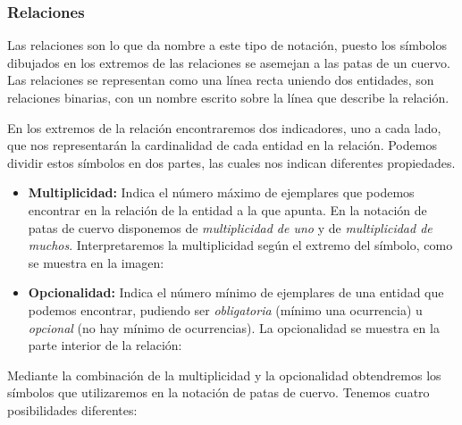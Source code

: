 \subsubsection{Relaciones}
Las relaciones son lo que da nombre a este tipo de notación, puesto los símbolos dibujados en los extremos de las relaciones se asemejan a las patas de un cuervo. Las relaciones se representan como una línea recta uniendo dos entidades, son relaciones binarias, con un nombre escrito sobre la línea que describe la relación.

En los extremos de la relación encontraremos dos indicadores, uno a cada lado, que nos representarán la cardinalidad de cada entidad en la relación. Podemos dividir estos símbolos en dos partes, las cuales nos indican diferentes propiedades.
\begin{itemize}
    \item \textbf{Multiplicidad: } Indica el número máximo de ejemplares que podemos encontrar en la relación de la entidad a la que apunta. En la notación de patas de cuervo disponemos de \emph{multiplicidad de uno} y de \emph{multiplicidad de muchos}. Interpretaremos la multiplicidad según el extremo del símbolo, como se muestra en la imagen:
    
    \item \textbf{Opcionalidad: }Indica el número mínimo de ejemplares de una entidad que podemos encontrar, pudiendo ser \emph{obligatoria} (mínimo una ocurrencia) u \emph{opcional} (no hay mínimo de ocurrencias). La opcionalidad se muestra en la parte interior de la relación:
\end{itemize}

Mediante la combinación de la multiplicidad y la opcionalidad obtendremos los símbolos que utilizaremos en la notación de patas de cuervo. Tenemos cuatro posibilidades diferentes:

